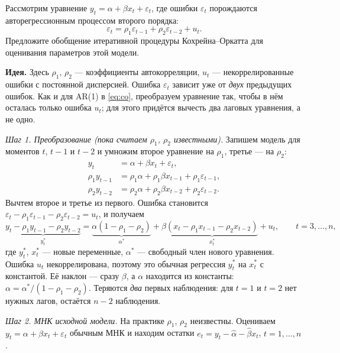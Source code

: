 \ifsolutions\clearpage\fi
{}

Рассмотрим уравнение $y_t = \alpha + \beta x_t + \varepsilon_t$, где ошибки
$\varepsilon_t$ порождаются авторегрессионным процессом второго порядка:
\[
  \varepsilon_t = \rho_1\varepsilon_{t-1} + \rho_2\varepsilon_{t-2} + u_t .
\]
Предложите обобщение итеративной процедуры Кохрейна--Оркатта для
оценивания параметров этой модели.

\begin{solution}
\textbf{Идея.} Здесь $\rho_1$, $\rho_2$ — коэффициенты автокорреляции,
$u_t$ — некоррелированные ошибки с постоянной дисперсией. Ошибка
$\varepsilon_t$ зависит уже от \emph{двух} предыдущих ошибок. Как и для
AR(1) в \eqref{eq:co}, преобразуем уравнение так, чтобы в нём осталась
только ошибка $u_t$; для этого придётся вычесть два лаговых уравнения, а не
одно.

\smallskip
\emph{Шаг 1. Преобразование (пока считаем $\rho_1$, $\rho_2$ известными).}
Запишем модель для моментов $t$, $t-1$ и $t-2$ и умножим второе уравнение на
$\rho_1$, третье — на $\rho_2$:
\begin{align*}
  y_t &= \alpha + \beta x_t + \varepsilon_t ,\\
  \rho_1y_{t-1} &= \rho_1\alpha + \rho_1\beta x_{t-1} + \rho_1\varepsilon_{t-1} ,\\
  \rho_2y_{t-2} &= \rho_2\alpha + \rho_2\beta x_{t-2} + \rho_2\varepsilon_{t-2} .
\end{align*}
Вычтем второе и третье из первого. Ошибка становится
$\varepsilon_t - \rho_1\varepsilon_{t-1} - \rho_2\varepsilon_{t-2} = u_t$, и
получаем
\[
  {\underbrace{y_t - \rho_1y_{t-1} - \rho_2y_{t-2}}_{y_t^*}}
  = {\underbrace{\alpha(1 - \rho_1 - \rho_2)}_{\alpha^*}}
  + \beta{\underbrace{(x_t - \rho_1x_{t-1} - \rho_2x_{t-2})}_{x_t^*}} + u_t,
  \qquad t = 3, \dots, n ,
\]
где $y_t^*$, $x_t^*$ — новые переменные, $\alpha^*$ — свободный член нового
уравнения. Ошибка $u_t$ некоррелирована, поэтому это обычная регрессия
$y_t^*$ на $x_t^*$ с константой. Её наклон — сразу $\beta$, а $\alpha$
находится из константы: $\alpha = \alpha^*/(1 - \rho_1 - \rho_2)$. Теряются
\emph{два} первых наблюдения: для $t = 1$ и $t = 2$ нет нужных лагов, остаётся
$n - 2$ наблюдения.

\smallskip
\emph{Шаг 2. МНК исходной модели.} На практике $\rho_1$, $\rho_2$ неизвестны.
Оцениваем $y_t = \alpha + \beta x_t + \varepsilon_t$ обычным МНК и находим
остатки $e_t = y_t - \widehat\alpha - \widehat\beta x_t$, $t = 1, \dots, n$.


\end{solution}
